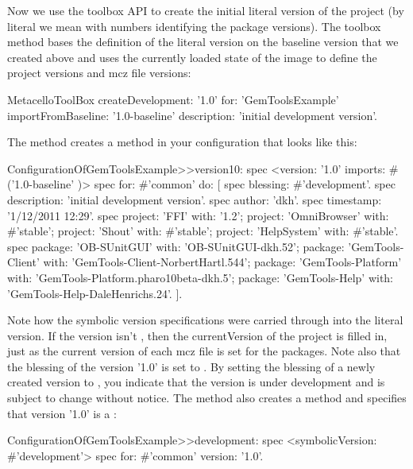 \documentclass[a4paper,10pt,twoside]{book}
\begin{document}
\begin{code}{}
\begin{code}{}
Now we use the toolbox API to create the initial literal version of the project (by literal we mean with numbers identifying the package versions). The toolbox method  bases the definition of the literal version on the baseline version that we created above and uses the currently loaded state of the image to define the project versions and mcz file versions:

\begin{code}{}
  MetacelloToolBox
     createDevelopment: '1.0'
     for: 'GemToolsExample'
     importFromBaseline: '1.0-baseline'
     description: 'initial development version'.
\end{code}

The  method creates a  method in your configuration that looks like this:

\begin{code}{}
ConfigurationOfGemToolsExample>>version10: spec
  <version: '1.0' imports: #('1.0-baseline' )>
  spec for: #'common' do: [
     spec blessing: #'development'.
     spec description: 'initial development version'.
     spec author: 'dkh'.
     spec timestamp: '1/12/2011 12:29'.
     spec 
        project: 'FFI' with: '1.2';
        project: 'OmniBrowser' with: #'stable';
        project: 'Shout' with: #'stable';
        project: 'HelpSystem' with: #'stable'.
     spec
        package: 'OB-SUnitGUI' with: 'OB-SUnitGUI-dkh.52';
        package: 'GemTools-Client' with: 'GemTools-Client-NorbertHartl.544';
        package: 'GemTools-Platform' with: 'GemTools-Platform.pharo10beta-dkh.5';
        package: 'GemTools-Help' with: 'GemTools-Help-DaleHenrichs.24'. ].
\end{code}

Note how the  symbolic version specifications were carried through into the literal version. If the version isn't , then the currentVersion of the project is filled in, just as the current version of each mcz file is set for the packages. Note also that the blessing of the version '1.0' is set to . By setting the blessing of a newly created version to , you indicate that the version is under development and is subject to change without notice. The  method also creates a  method and specifies that version '1.0' is a :

\begin{code}{}
ConfigurationOfGemToolsExample>>development: spec
  <symbolicVersion: #'development'>
  spec for: #'common' version: '1.0'.
\end{code}



\end{code}
\end{code}
\end{document}
